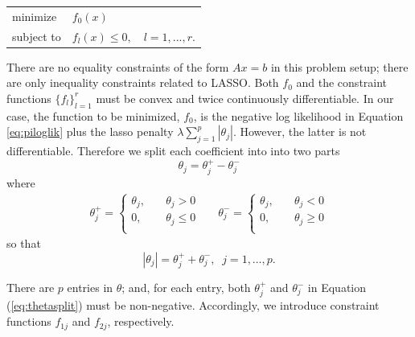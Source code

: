 \documentclass[11pt]{report}
\begin{document}
\begin{center}\begin{tabular}{ll}
minimize &$f_0(x)$\\
subject to &$f_l(x) \leq 0, \quad l = 1, ..., r$.
\end{tabular}\end{center}

There are no equality constraints of the form $Ax = b$ in this problem setup; there are only inequality constraints related to LASSO. Both $f_0$ and the constraint functions $\{ f_l \}_{l = 1}^r$ must be convex and twice continuously differentiable. In our case, the function to be minimized, $f_0$, is the negative log likelihood in Equation \ref{eq:piloglik} plus the lasso penalty $\lambda \sum_{j = 1}^p |\theta_j|$. However, the latter is not differentiable. 
Therefore we split each coefficient into into two parts 
\begin{equation}\theta_j = \theta_j^+ - \theta_j^-\label{eq:thetasplit}\end{equation} where 
\begin{align}
\theta_j^+ = \left\{\begin{array}{ll}\theta_j, \quad& \theta_j > 0\\0, \quad& \theta_j \leq 0\\\end{array}\right.&&
\theta_j^- = \left\{\begin{array}{ll}\theta_j, \quad& \theta_j < 0\\0, \quad& \theta_j \geq 0\\\end{array}\right.
\label{eg:thetadefs}\end{align}
so that
$$|\theta_j| = \theta_j^+ + \theta_j^-, \;\; j=1,\ldots,p.$$

There are $p$ entries in $\theta$; and, for each entry, both $\theta_j^+$ and $\theta_j^-$ in Equation (\ref{eq:thetasplit}) must be non-negative. Accordingly, we introduce constraint functions $f_{1j}$ and $f_{2j}$, respectively. 
\end{document}
